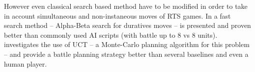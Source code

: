 
However even classical search based method have to be modified in order to take in account simultaneous and non-instaneous moves of RTS games.
In \cite{abcd} a fast search method -- Alpha-Beta search for duratives moves -- is presented and proven better than commonly used AI scripts (with battle up to 8 vs 8 units). 
\cite{wargusuct} investigates the use of UCT -- a Monte-Carlo planning algorithm for this problem -- and provide a battle planning strategy better than several baselines and even a human player.
